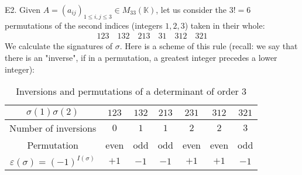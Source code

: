 \begin{tcolorbox}[colframe=black,colback=white,sharp corners]
	E2. Given $A=(a_{ij})_{1\leq i,j\leq 3} \in M_{33}(\mathbb{K})$, let us consider the $3!=6$ permutations of the second indices (integers $1,2,3$) taken in their whole\label{determinant of three by three matrix}:
	\begin{align*}
	123 \quad 132 \quad 213 \quad 31 \quad 312 \quad 321
	\end{align*}
	We calculate the signatures of $\sigma$. Here is a scheme of this rule (recall: we say that there is an "inverse", if in a permutation, a greatest integer precedes a lower integer):
	\begin{table}[H]	
		\begin{center}
			\begin{tabular}{|c|c|c|c|c|c|c|}
			\hline
			  \rowcolor[gray]{0.75}$\sigma(1)\sigma(2)$ & $123$ & $132$ & $213$ & $231$ & $312$ & $321$\\
			  \hline
			  \cellcolor{black!30}Number of inversions & $0$ & $1$ & $1$ & $2$ & $2$ & $3$\\\hline
			  \cellcolor{black!30}Permutation & even & odd & odd & even & even & odd  \\\hline
			  \cellcolor{black!30}$\varepsilon(\sigma)=(-1)^{I(\sigma)}$ & $+1$ & $-1$ & $-1$ & $+1$ & $+1$ & $-1$\\\hline
			\end{tabular}
		\end{center}
		\caption{Inversions and permutations of a determinant of order $3$}
	\end{table}
	\end{tcolorbox}
	
	\pagebreak
	

